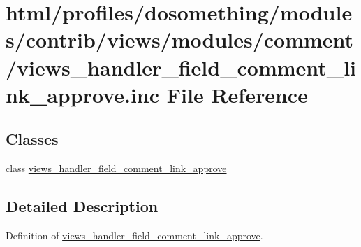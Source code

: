 \hypertarget{views__handler__field__comment__link__approve_8inc}{
\section{html/profiles/dosomething/modules/contrib/views/modules/comment/views\_\-handler\_\-field\_\-comment\_\-link\_\-approve.inc File Reference}
\label{views__handler__field__comment__link__approve_8inc}
}
\subsection*{Classes}
\begin{DoxyCompactItemize}
\item 
class \hyperlink{classviews__handler__field__comment__link__approve}{views\_\-handler\_\-field\_\-comment\_\-link\_\-approve}
\end{DoxyCompactItemize}


\subsection{Detailed Description}
Definition of \hyperlink{classviews__handler__field__comment__link__approve}{views\_\-handler\_\-field\_\-comment\_\-link\_\-approve}. 